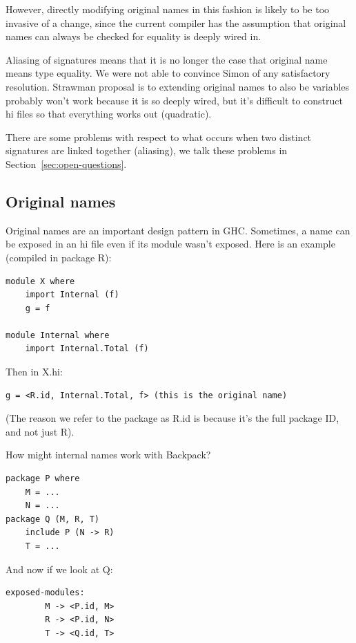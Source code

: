 \documentclass{article}
\begin{document}
However, directly modifying original names in this fashion
is likely to be too invasive of a change, since the current compiler has
the assumption that original names can always be checked for equality
is deeply wired in.

Aliasing of signatures means that it is no longer the case that
original name means type equality.  We were not able to convince
Simon of any satisfactory resolution.  Strawman proposal is to
extending original names to also be variables probably won't work
because it is so deeply wired, but it's difficult to construct hi
files so that everything works out (quadratic).


There are some problems with respect to what occurs when two
distinct signatures are linked together (aliasing), we talk these problems in
Section~\ref{sec:open-questions}.

\fi

\subsection{Original names} Original names are an important design pattern
in GHC\@.
Sometimes, a name can be exposed in an hi file even if its module
wasn't exposed. Here is an example (compiled in package R):

\begin{verbatim}
module X where
    import Internal (f)
    g = f

module Internal where
    import Internal.Total (f)
\end{verbatim}

Then in X.hi:

\begin{verbatim}
g = <R.id, Internal.Total, f> (this is the original name)
\end{verbatim}

(The reason we refer to the package as R.id is because it's the
full package ID, and not just R).

How might internal names work with Backpack?

\begin{verbatim}
package P where
    M = ...
    N = ...
package Q (M, R, T)
    include P (N -> R)
    T = ...
\end{verbatim}

And now if we look at Q\@:

\begin{verbatim}
exposed-modules:
        M -> <P.id, M>
        R -> <P.id, N>
        T -> <Q.id, T>
\end{verbatim}
\end{document}

